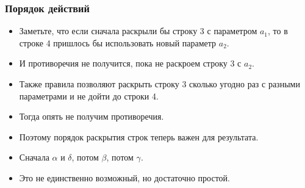\documentclass[10pt]{beamer}
\begin{document}
\begin{frame}
\frametitle{Порядок действий}
\begin{itemize}
    \item Заметьте, что если сначала раскрыли бы строку 3 с параметром $a_1$, то в строке 4 пришлось бы использовать новый параметр $a_2$.
    \item И противоречия не получится, пока не раскроем строку 3 с $a_2$. \pause
    \item Также правила позволяют раскрыть строку 3 сколько угодно раз с разными параметрами и не дойти до строки 4.
    \item Тогда опять не получим противоречия. \pause
    \item Поэтому порядок раскрытия строк теперь важен для результата. \pause
    \item Сначала $\alpha$ и $\delta$, потом $\beta$, потом $\gamma$. \pause
    \item Это не единственно возможный, но достаточно простой.
\end{itemize}
\end{frame}
\end{document}
